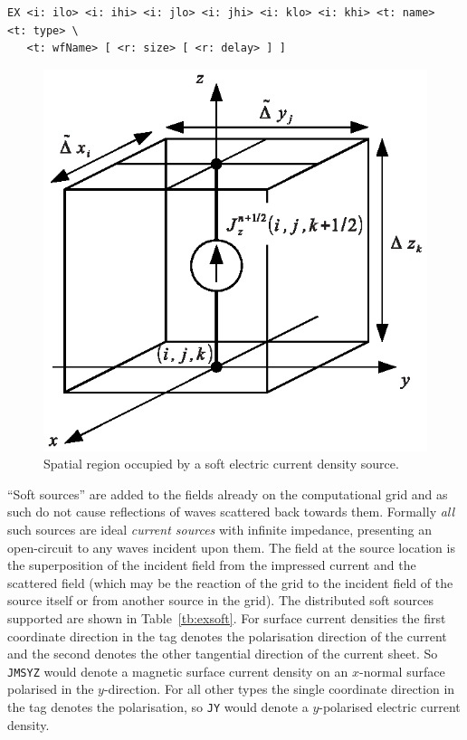 \documentclass[onecolumn,a4paper]{article}
\numberwithin{equation}{section}
\begin{document}
\begin{verbatim}
EX <i: ilo> <i: ihi> <i: jlo> <i: jhi> <i: klo> <i: khi> <t: name>  <t: type> \
   <t: wfName> [ <r: size> [ <r: delay> ] ]
\end{verbatim}

\begin{figure}[ht]
  \begin{center}
   \includegraphics[width=0.4\linewidth]{figures/curr_src}
  \end{center}
  \vspace{-5mm}
  \caption{\label{fg:curr_src}Spatial region occupied by a soft electric current density source.}
\end{figure}

``Soft sources'' are added to the fields already on the computational
grid and as such do not cause reflections of waves scattered back towards them. 
Formally {\em all} such sources are ideal {\em current sources} with infinite impedance,
presenting an open-circuit to any waves incident upon them.
The field at the source location is the superposition of the incident field from the impressed
current and the scattered field (which may be the reaction of the grid to the incident field 
of the source itself or from another source in the grid).
The distributed soft sources supported are shown in Table~\ref{tb:exsoft}.
For surface current densities the first coordinate direction in the tag denotes the polarisation
direction of the current and the second denotes the other tangential direction of the current
sheet. So \texttt{JMSYZ} would denote a magnetic surface current density on an $x$-normal surface
polarised in the $y$-direction. For all other types the single coordinate direction in the tag 
denotes the polarisation, so \texttt{JY} would denote a $y$-polarised electric current density.
\end{document}
